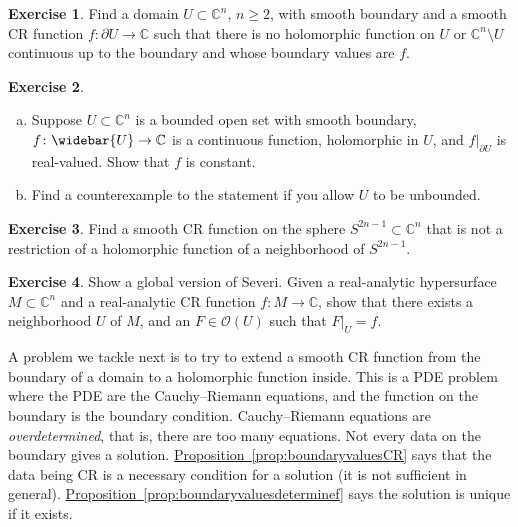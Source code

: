 \documentclass[12pt,openany]{book}
\newcommand{\C}{{\mathbb{C}}}
\newcommand{\sO}{{\mathscr{O}}}
\newcommand{\myindex}[1]{#1\index{#1}}
\theoremstyle{plain}
\theoremstyle{remark}
\theoremstyle{definition}
\newenvironment{exbox}{%
    \def\FrameCommand{\vrule width 1pt \relax\hspace{10pt}}%
    \MakeFramed{\advance\hsize-\width\FrameRestore}%
}{%
    \endMakeFramed
}
\newenvironment{exparts}{%
    \leavevmode\begin{enumerate}[a),noitemsep,topsep=0pt,parsep=0pt,partopsep=0pt]
}{%
    \end{enumerate}
}
\theoremstyle{exercise}
\newtheorem{exercise}{Exercise}[section]
\theoremstyle{example}
\newcommand{\propref}[1]{\hyperref[#1]{Proposition~\ref*{#1}}}
\begin{document}
\begin{exbox}
\begin{exercise}
Find a domain $U \subset \C^n$, $n \geq 2$, with smooth boundary and a smooth
CR function $f \colon \partial U \to \C$ such that there is no holomorphic function
on $U$ or $\C^n \setminus U$ continuous up to the boundary and whose boundary values are $f$.
\end{exercise}

\begin{exercise}
\begin{exparts}
\item
Suppose $U \subset \C^n$ is a bounded open set with smooth boundary,
$f \colon \widebar{U} \to \C$ is a continuous function, holomorphic in
$U$, and $f|_{\partial U}$ is real-valued.  Show that $f$ is
constant.
\item
Find a counterexample to the statement if you allow $U$
to be unbounded.
\end{exparts}
\end{exercise}

\begin{exercise}
Find a smooth CR function on the sphere $S^{2n-1} \subset \C^n$ that is not
a restriction of a holomorphic function of a neighborhood of $S^{2n-1}$.
\end{exercise}

\begin{exercise}
Show a global version of Severi.  Given a real-analytic hypersurface $M
\subset \C^n$ and a real-analytic CR function $f \colon M \to \C$,
show that there exists a neighborhood $U$ of $M$, and an $F \in \sO(U)$
such that $F|_U = f$.
\end{exercise}
\end{exbox}

A problem we tackle next is to try to extend
a smooth CR function from the boundary of a domain to a holomorphic
function inside.  This is a PDE problem where the PDE are
the Cauchy--Riemann equations, and the function on the boundary is
the boundary condition.
Cauchy--Riemann equations are
\emph{\myindex{overdetermined}}, that is, there are too many
equations.  Not every data on the boundary gives a solution.
\propref{prop:boundaryvaluesCR} says that the data being CR is a necessary condition
for a solution (it is not sufficient in general).
\propref{prop:boundaryvaluesdeterminef} says the solution is unique
if it exists.

\end{document}

